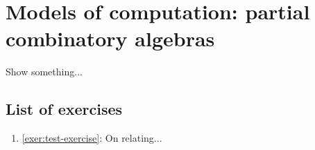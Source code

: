 \chapter{Models of computation: partial combinatory algebras}\label{chap:PCA}

\begin{exercise}\label{exer:test-exercise}
  Show something...
\end{exercise}

\cite{Schonfinkel1924}
\cite{Kleene1945}
\cite{Scott1976}
\cite{KleeneVesley1965}

\section{List of exercises}
\begin{enumerate}
\item \cref{exer:test-exercise}: On relating...
\end{enumerate}




